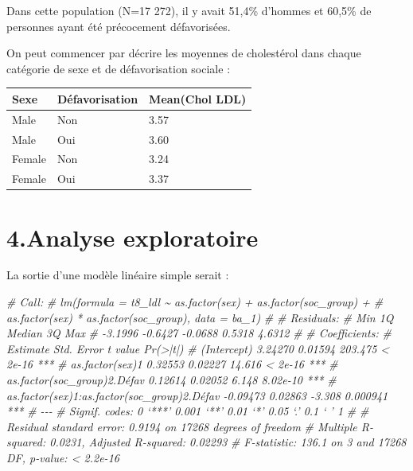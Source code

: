 \documentclass[
]{book}
\newenvironment{Shaded}{\begin{snugshade}}{\end{snugshade}}
\newcommand{\CommentTok}[1]{\textcolor[rgb]{0.56,0.35,0.01}{\textit{#1}}}
\begin{document}
Dans cette population (N=17 272), il y avait 51,4\% d'hommes et 60,5\% de personnes ayant été précocement défavorisées.

On peut commencer par décrire les moyennes de cholestérol dans chaque catégorie de sexe et de défavorisation sociale :

\begin{table}
\centering
\begin{tabular}[t]{l|l|l}
\hline
Sexe & Défavorisation & Mean(Chol LDL)\\
\hline
Male & Non & 3.57\\
\hline
Male & Oui & 3.60\\
\hline
Female & Non & 3.24\\
\hline
Female & Oui & 3.37\\
\hline
\end{tabular}
\end{table}

\hypertarget{analyse-exploratoire}{%
\section{4.Analyse exploratoire}\label{analyse-exploratoire}}

La sortie d'une modèle linéaire simple serait :

\begin{Shaded}
\begin{Highlighting}[]
\CommentTok{\# Call:}
\CommentTok{\# lm(formula = t8\_ldl \textasciitilde{} as.factor(sex) + as.factor(soc\_group) + }
\CommentTok{\#     as.factor(sex) * as.factor(soc\_group), data = ba\_1)}
\CommentTok{\# }
\CommentTok{\# Residuals:}
\CommentTok{\#     Min      1Q  Median      3Q     Max }
\CommentTok{\# {-}3.1996 {-}0.6427 {-}0.0688  0.5318  4.6312 }
\CommentTok{\# }
\CommentTok{\# Coefficients:}
\CommentTok{\#                                             Estimate Std. Error t value Pr(\textgreater{}|t|)    }
\CommentTok{\# (Intercept)                                  3.24270    0.01594 203.475  \textless{} 2e{-}16 ***}
\CommentTok{\# as.factor(sex)1                              0.32553    0.02227  14.616  \textless{} 2e{-}16 ***}
\CommentTok{\# as.factor(soc\_group)2.Défav                  0.12614    0.02052   6.148 8.02e{-}10 ***}
\CommentTok{\# as.factor(sex)1:as.factor(soc\_group)2.Défav {-}0.09473    0.02863  {-}3.308 0.000941 ***}
\CommentTok{\# {-}{-}{-}}
\CommentTok{\# Signif. codes:  0 ‘***’ 0.001 ‘**’ 0.01 ‘*’ 0.05 ‘.’ 0.1 ‘ ’ 1}
\CommentTok{\# }
\CommentTok{\# Residual standard error: 0.9194 on 17268 degrees of freedom}
\CommentTok{\# Multiple R{-}squared:  0.0231,  Adjusted R{-}squared:  0.02293 }
\CommentTok{\# F{-}statistic: 136.1 on 3 and 17268 DF,  p{-}value: \textless{} 2.2e{-}16}
\end{Highlighting}
\end{Shaded}
\end{document}
